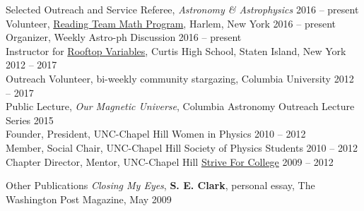 \documentclass{resume_clark} %
\begin{document}
\begin{rSection}{Selected Outreach and Service}
Referee, {\it Astronomy \& Astrophysics} \hfill{2016 -- present}\\
Volunteer, \href{http://www.readingteam.org/}{Reading Team Math Program}, Harlem, New York \hfill{2016 -- present}\\
Organizer, Weekly Astro-ph Discussion \hfill{2016 -- present}\\
Instructor for \href{http://rv.astro.columbia.edu/}{Rooftop Variables}, Curtis High School, Staten Island, New York \hfill{2012 -- 2017}\\
Outreach Volunteer, bi-weekly community stargazing, Columbia University \hfill{2012 -- 2017}\\
Public Lecture, \textit{Our Magnetic Universe}, Columbia Astronomy Outreach Lecture Series \hfill{2015} \\ 
Founder, President, UNC-Chapel Hill Women in Physics \hfill{2010 -- 2012}\\
Member, Social Chair, UNC-Chapel Hill Society of Physics Students \hfill{2010 -- 2012}\\
Chapter Director, Mentor, UNC-Chapel Hill \href{http://striveforcollege.org/}{Strive For College} \hfill{2009 -- 2012}\\

\end{rSection}



\begin{rSection}{Other Publications}
{\textit{Closing My Eyes}}, \textbf{S. E. Clark}, personal essay, The Washington Post Magazine, May 2009
\end{rSection}


\end{document}

